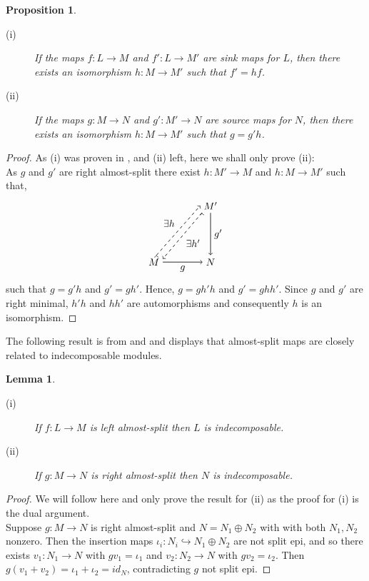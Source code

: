 \documentclass[11.5pt, twoside, a4paper, titlepage]{report}
\theoremstyle{definition}
\theoremstyle{plain}
\newtheorem{lem}[mydef]{Lemma}
\newtheorem{prop}[mydef]{Proposition}
\begin{document}
\begin{prop}
\begin{description}
\item [(i)] If the maps $f: L \to M$ and $f': L \to M'$ are sink maps for $L$, then there exists an isomorphism $h: M \to M'$ such that $f'=hf$.
\item [(ii)] If the maps $g: M \to N$ and $g': M' \to N$ are source maps for $N$, then there exists an isomorphism $h: M \to M'$ such that $g=g'h$.
\end{description}
\end{prop}
\begin{proof}
As (i) was proven in \cite{Assem}, and (ii) left, here we shall only prove (ii):\\
As $g$ and $g'$ are right almost-split there exist $h: M' \to M$ and $h:M \to M'$ such that,
\begin{equation*}
\begin{tikzpicture}[->,-latex, auto, main path/.style={->, semithick}, main node/.style={}]
\node	[main node]		(1) at (0,0)		{$M$};
\node [main node]		(2) at (2, 0)		{$N$};
\node [main node]		(3) at (2,2)		{$M'$};

\draw (1) [main path] edge node [auto, swap] {$g$} (2);
\draw (3) [main path] edge node [auto] {$g'$} (2);
\draw (3.220) [->, dashed, semithick] edge node [auto] {$\exists h'$} (1.20);
\draw (1.70) [->, dashed, semithick] edge node [auto] {$\exists h$} (3.180);
\end{tikzpicture}
\end{equation*}
such that $g=g'h$ and $g'=gh'$. Hence, $g=gh'h$ and $g'=ghh'$. Since $g$ and $g'$ are right minimal, $h'h$ and $hh'$ are automorphisms and consequently $h$ is an isomorphism.
\end{proof}

The following result is from \cite{Vale} and \cite{Assem} and displays that almost-split maps are closely related to indecomposable modules.

\begin{lem} \label{indeclem}
\begin{description}
\item [(i)] If $f: L \to M$ is left almost-split then $L$ is indecomposable.
\item [(ii)] If $g: M \to N$ is right almost-split then $N$ is indecomposable.
\end{description}
\end{lem}
\begin{proof}
We will follow \cite{Vale} here and only prove the result for (ii) as the proof for (i) is the dual argument.\\
Suppose $g: M \to N$ is right almost-split and $N=N_1\oplus N_2$ with with both $N_1, N_2$ nonzero. Then the insertion maps $\iota_i: N_i \hookrightarrow N_1 \oplus N_2$ are not split epi, and so there exists $v_1: N_1 \to N$ with $gv_1=\iota_1$ and $v_2: N_2 \to N$ with $gv_2=\iota_2$. Then $g(v_1 + v_2) = \iota_1 + \iota _2 =id_N$, contradicting $g$ not split epi. 
\end{proof}
\end{document}
